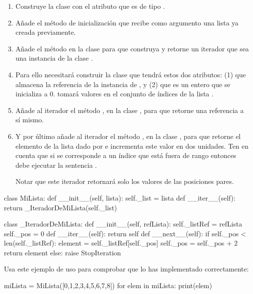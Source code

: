 \begin{enumerate}
\item Construye la clase  con el atributo  que es de tipo .

\item Añade el método de inicialización  que recibe como argumento una lista ya creada previamente.

\item Añade el método  en la clase  para que construya y retorne un iterador que sea una instancia de la clase .

\item Para ello necesitará construir la clase  que tendrá estos dos  atributos: (1)  que almacena la referencia de la instancia de , y (2)   que es un entero que se inicializa a 0.  tomará valores en el conjunto de índices de la lista .

\item Añade al iterador el método , en la clase , para que retorne una referencia a sí mismo.

\item Y por último añade al iterador el método , en la clase , para que retorne el elemento de la lista dado por  e incrementa este valor en dos unidades. Ten en cuenta que si  se corresponde a un índice que está fuera de rango entonces debe ejecutar la sentencia .

	Notar que este iterador retornará solo los valores de las posiciones pares.
\end{enumerate}


\begin{pyconcode}
class MiLista:
  def __init__(self, lista):
    self._list = lista
  def __iter__(self):
    return _IteradorDeMiLista(self._list)

class _IteradorDeMiLista:
  def __init__(self, refLista):
    self._listRef = refLista
    self._pos = 0
  def __iter__(self):
    return self
  def __next__(self):
    if self._pos < len(self._listRef):
      element = self._listRef[self._pos]
      self._pos = self._pos + 2
      return element
    else:
      raise StopIteration

\end{pyconcode}
Usa este ejemplo de uso para comprobar que lo has implementado correctamente:
\begin{pyconsole}[][frame=single]      
miLista = MiLista([0,1,2,3,4,5,6,7,8])
for elem in miLista:
  print(elem)

\end{pyconsole}

